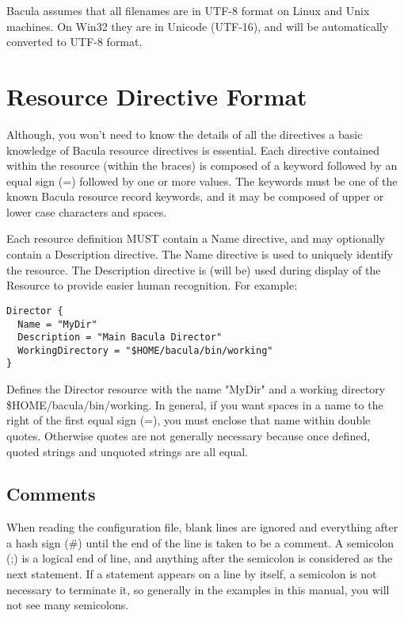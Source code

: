Bacula assumes that all filenames are in UTF-8 format on Linux and
Unix machines. On Win32 they are in Unicode (UTF-16), and will
be automatically converted to UTF-8 format.

\section{Resource Directive Format}

Although, you won't need to know the details of all the directives a basic
knowledge of Bacula resource directives is essential. Each directive contained
within the resource (within the braces) is composed of a keyword followed by
an equal sign (=) followed by one or more values. The keywords must be one of
the known Bacula resource record keywords, and it may be composed of upper or
lower case characters and spaces. 

Each resource definition MUST contain a Name directive, and may optionally
contain a Description directive. The Name directive is used to
uniquely identify the resource. The Description directive is (will be) used
during display of the Resource to provide easier human recognition. For
example: 

\footnotesize
\begin{verbatim}
Director {
  Name = "MyDir"
  Description = "Main Bacula Director"
  WorkingDirectory = "$HOME/bacula/bin/working"
}
\end{verbatim}
\normalsize

Defines the Director resource with the name "MyDir" and a working directory
\$HOME/bacula/bin/working. In general, if you want spaces in a name to the
right of the first equal sign (=), you must enclose that name within double
quotes. Otherwise quotes are not generally necessary because once defined,
quoted strings and unquoted strings are all equal.

\label{Comments}
\subsection{Comments}

When reading the configuration file, blank lines are ignored and everything
after a hash sign (\#) until the end of the line is taken to be a comment. A
semicolon (;) is a logical end of line, and anything after the semicolon is
considered as the next statement. If a statement appears on a line by itself,
a semicolon is not necessary to terminate it, so generally in the examples in
this manual, you will not see many semicolons. 
\label{Case1}

